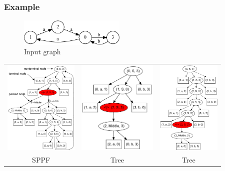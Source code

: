 \documentclass{beamer}
\begin{document}
\begin{frame}
  \transwipe[direction=90]
  \frametitle{Example}
\begin{figure}[ht]
    \centering
        \includegraphics[width=0.45\textwidth]{pictures/input.pdf}
        \caption{Input graph}
\end{figure}

\begin{tabular}{  c  c  c  }
      \includegraphics[height=4.5cm]{pictures/AnBn.pdf}
    &
      \includegraphics[height=4.5cm]{pictures/AnBn_2.pdf}
    &
      \includegraphics[height=4.5cm]{pictures/AnBn_1.pdf}

\\
SPPF
& Tree 
& Tree
  \end{tabular}
\end{frame}
\end{document}

